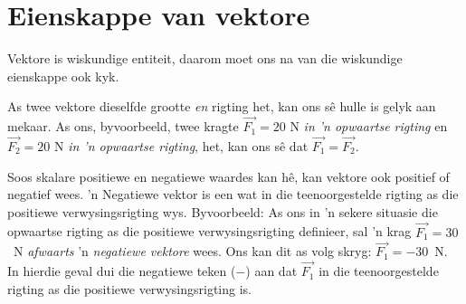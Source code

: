 \section{Eienskappe van vektore}
    \nopagebreak
    \label{m38813*cid7}
      \label{m38813*id188277}

Vektore is wiskundige entiteit, daarom moet ons na van die wiskundige eienskappe ook kyk.

As twee vektore dieselfde grootte \textit{en} rigting het, kan ons sê hulle is gelyk aan mekaar. As ons, byvoorbeeld, twee kragte  $\stackrel{\to }{F_{1}} = 20$ N \textit{in  'n opwaartse rigting} en $\stackrel{\to }{F_{2}} = 20$ N \textit{in  'n opwaartse rigting}, het, kan ons s\^{e} dat $\stackrel{\to }{F_{1}} = \stackrel{\to }{F_{2}}$.



Soos skalare positiewe en negatiewe waardes kan hê, kan vektore ook positief of negatief wees.  'n Negatiewe vektor is een wat in die teenoorgestelde rigting as die positiewe verwysingsrigting wys. Byvoorbeeld: As ons in  'n sekere situasie die opwaartse rigting as die positiewe verwysingsrigting definieer, sal  'n krag $\stackrel{\to }{F_{1}} = 30$~N \textit{afwaarts} 'n \textit{negatiewe vektore} wees. Ons kan dit as volg skryg: $\stackrel{\to }{F_{1}} = -30$~N. In hierdie geval dui die negatiewe teken ($-$) aan dat $\stackrel{\to }{F_{1}}$ in die teenoorgestelde rigting as die positiewe verwysingsrigting is.


